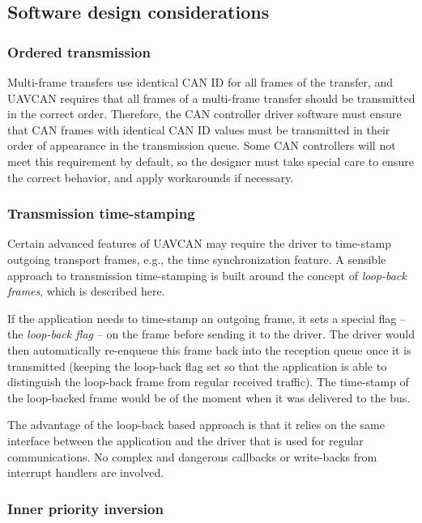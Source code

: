 \subsection{Software design considerations}

\subsubsection{Ordered transmission}

Multi-frame transfers use identical CAN ID for all frames of the transfer,
and UAVCAN requires that all frames of a multi-frame transfer should be transmitted in the correct order.
Therefore, the CAN controller driver software must ensure that CAN frames with identical CAN ID values
must be transmitted in their order of appearance in the transmission queue.
Some CAN controllers will not meet this requirement by default,
so the designer must take special care to ensure the correct behavior, and apply workarounds if necessary.

\subsubsection{Transmission time-stamping}

Certain advanced features of UAVCAN may require the driver to time-stamp outgoing transport frames, e.g.,
the time synchronization feature.
A sensible approach to transmission time-stamping is built around the concept of \emph{loop-back frames},
which is described here.

If the application needs to time-stamp an outgoing frame, it sets a special flag -- the \emph{loop-back flag} --
on the frame before sending it to the driver.
The driver would then automatically re-enqueue this frame back into the reception queue once it is transmitted
(keeping the loop-back flag set so that the application is able to distinguish the loop-back
frame from regular received traffic).
The time-stamp of the loop-backed frame would be of the moment when it was delivered to the bus.

The advantage of the loop-back based approach is that it relies on the same interface between
the application and the driver that is used for regular communications.
No complex and dangerous callbacks or write-backs from interrupt handlers are involved.

\subsubsection{Inner priority inversion}

